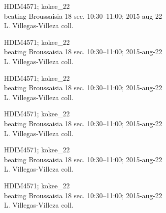 \documentclass[2pt]{extarticle}
\begin{document}
\noindent
\parbox{0.16\textwidth}{\tiny \raggedright \rule[-0.3\baselineskip]{0pt}{10pt}HDIM4571; kokee\_22\\ beating Broussaisia 18 sec. 10:30--11:00; 2015-aug-22\\ L. Villegas-Villeza coll.}
\parbox{0.16\textwidth}{\tiny \raggedright \rule[-0.3\baselineskip]{0pt}{10pt}HDIM4571; kokee\_22\\ beating Broussaisia 18 sec. 10:30--11:00; 2015-aug-22\\ L. Villegas-Villeza coll.}
\parbox{0.16\textwidth}{\tiny \raggedright \rule[-0.3\baselineskip]{0pt}{10pt}HDIM4571; kokee\_22\\ beating Broussaisia 18 sec. 10:30--11:00; 2015-aug-22\\ L. Villegas-Villeza coll.}
\parbox{0.16\textwidth}{\tiny \raggedright \rule[-0.3\baselineskip]{0pt}{10pt}HDIM4571; kokee\_22\\ beating Broussaisia 18 sec. 10:30--11:00; 2015-aug-22\\ L. Villegas-Villeza coll.}
\parbox{0.16\textwidth}{\tiny \raggedright \rule[-0.3\baselineskip]{0pt}{10pt}HDIM4571; kokee\_22\\ beating Broussaisia 18 sec. 10:30--11:00; 2015-aug-22\\ L. Villegas-Villeza coll.}
\parbox{0.16\textwidth}{\tiny \raggedright \rule[-0.3\baselineskip]{0pt}{10pt}HDIM4571; kokee\_22\\ beating Broussaisia 18 sec. 10:30--11:00; 2015-aug-22\\ L. Villegas-Villeza coll.} \\ 
\vspace{0.001in} 
\end{document}
